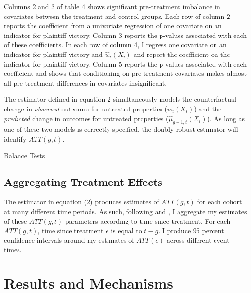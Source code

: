 \documentclass[12pt]{article}
\begin{document}
    Columns 2 and 3 of table 4 shows significant pre-treatment imbalance in covariates between the treatment and control groups. Each row of column 2 reports the coefficient from a univariate regression of one covariate on an indicator for plaintiff victory. Column 3 reports the p-values associated with each of these coefficients. In each row of column 4, I regress one covariate on an indicator for plaintiff victory and $\hat{w}_i(X_i)$ and report the coefficient on the indicator for plaintiff victory. Column 5 reports the p-values associated with each coefficient and shows that conditioning on pre-treatment covariates makes almost all pre-treatment differences in covariates insignificant.

    The estimator defined in equation 2 simultaneously models the counterfactual change in \emph{observed} outcomes for untreated properties ($\hat{w}_i(X_i)$) and the \emph{predicted} change in outcomes for untreated properties ($\hat{\mu}_{g-1, t}(X_i)$). As long as one of these two models is correctly specified, the doubly robust estimator will identify $ATT(g, t)$.

    \begin{landscape}
        
    \begin{table}[H]
        \centering
        
        \caption{Balance Tests}
        \label{tab:my_label}
    \end{table} 
    
    \end{landscape}


    \subsection{Aggregating Treatment Effects}
        The estimator in equation (2) produces estimates of $ATT(g, t)$ for each cohort at many different time periods. As such, following \cite{callaway_difference--differences_2021} and \cite{goodman-bacon_changes_2019}, I aggregate my estimates of these $ATT(g, t)$ parameters according to time since treatment. For each $ATT(g, t)$, time since treatment $e$ is equal to $t-g$. I produce 95 percent confidence intervals around my estimates of $ATT(e)$ across different event times.
    
\section{Results and Mechanisms} \label{sec:result}
\end{document}
